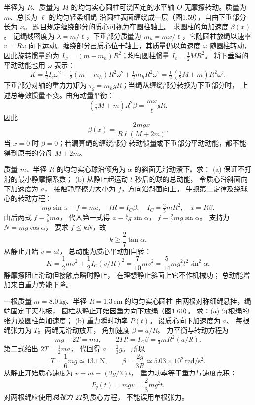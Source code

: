 
半径为 $R$、质量为 $M$ 的均匀实心圆柱可绕固定的水平轴
$O$ 无摩擦转动。质量为 $m$、总长为 $\ell$ 的均匀轻柔细绳
沿圆柱表面缠绕成一层（图1.59），自由下垂部分长为 $x$。
题目规定缠绕部分的质心可视为在圆柱轴上。
求圆柱的角加速度 $\beta(x)$。
\exsolution
记绳线密度为 $\lambda=m/\ell$，下垂部分质量为
$m_h=mx/\ell$，它随圆柱放绳以速率 $v=R\omega$
向下运动。缠绕部分虽质心位于轴上，其质量仍以角速度
$\omega$ 随圆柱转动，因此旋转惯量约为
$I_w=(m-m_h)R^2$；均匀圆柱惯量
$I_c=\frac12MR^2$。
将下垂绳的平动动能也用 $\omega$ 表示：
\[
K=\tfrac12 I_c\omega^2+
\tfrac12(m-m_h)R^2\omega^2+
\tfrac12m_hR^2\omega^2
=\tfrac12(\tfrac12M+m)R^2\omega^2.
\]
下垂部分对轴的重力力矩为
$\tau_g=m_hgR$；当绳从缠绕部分转换为下垂部分时，
上述总等效惯量不变。由角动量平衡：
\[
(\tfrac12M+m)R^2\beta
=\frac{mx}{\ell}gR.
\]
因此
\[
\boxed{\beta(x)=\frac{2mgx}{R\ell(M+2m)}}.
\]
\excheck 当 $x=0$ 时 $\beta=0$；若漏算绳的缠绕部分
转动惯量或下垂部分平动动能，都不能得到原书的分母 $M+2m$。

质量 $m$、半径 $R$ 的均匀实心球沿倾角为
$\alpha$ 的斜面无滑动滚下。求：
(a) 保证不打滑的最小静摩擦系数；
(b) 从静止起运动 $t$ 秒后的球的总动能。
\exsolution
令质心沿斜面向下加速度为 $a$，
接触静摩擦力大小为 $f$，方向沿斜面向上。
牛顿第二定律及绕球心的转动方程：
\[
mg\sin\alpha-f=ma,\quad
fR=I_C\beta,\quad
I_C=\tfrac25mR^2,\quad a=R\beta.
\]
由后两式 $f=\frac25ma$，
代入第一式得
$a=\frac57g\sin\alpha$，
$f=\frac27mg\sin\alpha$。
支持力 $N=mg\cos\alpha$，
要求 $f\le kN$，故
\[
\boxed{k\ge\frac27\tan\alpha}.
\]
从静止开始 $v=at$，
总动能为质心平动加自转：
\[
K=\frac12mv^2+\frac12I_C(v/R)^2
=\frac7{10}mv^2
=\boxed{\frac5{14}mg^2t^2\sin^2\alpha}.
\]
\excheck 静摩擦阻止滑动但接触点瞬时静止，
在理想静止斜面上它不作机械功；
总动能增加来自重力势能下降。

一根质量 $m=8.0\,\mathrm{kg}$、半径
$R=1.3\,\mathrm{cm}$ 的均匀实心圆柱
由两根对称细绳悬挂，绳端固定于天花板，
圆柱从静止开始因重力向下放绳（图1.60）。
求：(a) 每根绳的张力及圆柱角加速度；
(b) 重力瞬时功率 $P(t)$。
\exsolution
设质心向下加速度为 $a$、
每根绳张力为 $T$。两绳无滑动放开，
角加速度 $\beta=a/R$。
力平衡与转动方程为
\[
mg-2T=ma,\qquad
2TR=I_C\beta=\tfrac12mR^2(a/R).
\]
第二式给出 $2T=\frac12ma$，
代回得 $a=\frac23g$。
所以
\[
\boxed{T=\frac16mg\simeq13.1\,\mathrm N},
\qquad
\boxed{\beta=\frac{2g}{3R}\simeq5.03\times10^2\,
\mathrm{rad/s^2}}.
\]
从静止开始质心速度为 $v=at=(2g/3)t$，
重力功率等于重力与速度点积：
\[
\boxed{P_g(t)=mgv=\frac23mg^2t}.
\]
\excheck 对两根绳应使用\emph{总张力 $2T$}列质心方程，
不能误用单根张力。

